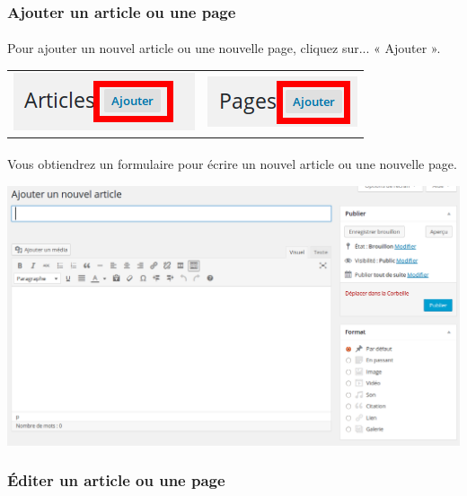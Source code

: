 \documentclass[10pt,a4paper]{article}
\begin{document}
\subsubsection{Ajouter un article ou une page}
\paragraph{}Pour ajouter un nouvel article ou une nouvelle page, cliquez sur... « Ajouter ».
\begin{center}
\begin{tabular}{cc}
\includegraphics[scale=0.35]{img/0063.png} &
\includegraphics[scale=0.4]{img/0065.png} \\
\end{tabular}
\end{center}
\paragraph{}Vous obtiendrez un formulaire pour écrire un nouvel article ou une nouvelle page.
\begin{center}
\includegraphics[scale=0.3]{img/0064.png}
\end{center}
\subsubsection{Éditer un article ou une page}
\end{document}
